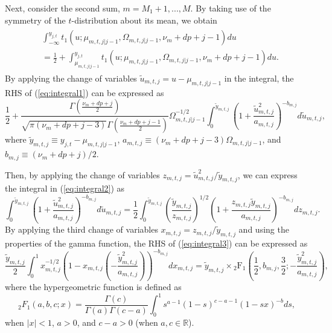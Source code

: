\documentclass[nojss]{jss}
\begin{document}
\begin{appendix}
Next, consider the second sum,  $m=M_1+1,...,M$. By taking use of the symmetry of the $t$-distribution about its mean, we obtain
\begin{align}\label{eq:integral1}
\begin{aligned}
&\int_{-\infty}^{y_{j,t}}t_1(u;\mu_{m,t,j|j-1},\Omega_{m,t,j|j-1},\nu_m + dp + j - 1)du \\
&= \frac{1}{2} + \int_{\mu_{m,t,j|j-1}}^{y_{j,t}}t_1(u;\mu_{m,t,j|j-1},\Omega_{m,t,j|j-1},\nu_m + dp + j - 1)du.
\end{aligned}
\end{align}
By applying the change of variables $\tilde{u}_{m,t,j} = u - \mu_{m,t,j|j-1}$ in the integral, the RHS of (\ref{eq:integral1}) can be expressed as
\begin{equation}\label{eq:integral2}
\frac{1}{2} + \frac{\Gamma\left(\frac{\nu_m + dp + j}{2}\right)}{\sqrt{\pi (\nu_m + dp + j - 3)}\Gamma\left(\frac{\nu_m + dp + j - 1}{2} \right)}\Omega_{m,t,j|j-1}^{-1/2}\int_{0}^{\tilde{y}_{m,t,j}}\left(1 + \frac{\tilde{u}_{m,t,j}^2}{a_{m,t,j}} \right)^{-b_{m,j}}d\tilde{u}_{m,t,j},
\end{equation}
where $\tilde{y}_{m,t,j} \equiv y_{j,t} - \mu_{m,t,j|j-1}$,  $a_{m,t,j} \equiv (\nu_m + dp + j - 3)\Omega_{m,t,j|j-1}$, and $b_{m,j}\equiv (\nu_m + dp + j)/2$.

Then, by applying the change of variables $z_{m,t,j} =  \tilde{u}_{m,t,j}^2/\tilde{y}_{m,t,j}$,  we can express the integral in (\ref{eq:integral2}) as
\begin{equation}\label{eq:integral3}
\int_{0}^{\tilde{y}_{m,t,j}}\left(1 + \frac{\tilde{u}_{m,t,j}^2}{a_{m,t,j}} \right)^{-b_{m,j}}d\tilde{u}_{m,t,j} = \frac{1}{2}\int_{0}^{\tilde{y}_{m,t,j}}\left(\frac{\tilde{y}_{m,t,j}}{z_{m,t,j}}  \right)^{1/2}\left(1 + \frac{z_{m,t,j}\tilde{y}_{m,t,j}}{a_{m,t,j}} \right)^{-b_{m,j}}dz_{m,t,j}.
\end{equation}
By applying the third change of variables $x_{m,t,j}=z_{m,t,j}/\tilde{y}_{m,t,j}$ and using the properties of the gamma function,  the RHS of (\ref{eq:integral3}) can be expressed as
\begin{equation}
\frac{\tilde{y}_{m,t,j}}{2}\int_0^1 x_{m,t,j}^{-1/2}\left(1 - x_{m,t,j}\left(-\frac{\tilde{y}_{m,t,j}^2}{a_{m,t,j}}\right)  \right)^{-b_{m,j}}dx_{m,t,j} = \tilde{y}_{m,t,j} \times {}_2\text{F}_1\left(\frac{1}{2}, b_{m,j}, \frac{3}{2}; -\frac{\tilde{y}_{m,t,j}^2}{a_{m,t,j}} \right),
\end{equation}
where the hypergeometric function is defined as \citep[Section 1.3.1]{Aomoto+Kita:2011}
\begin{equation}
{}_2F_1(a,b,c;x)=\frac{\Gamma(c)}{\Gamma(a)\Gamma(c-a)}\int_0^1 s^{a-1}(1-s)^{c-a-1}(1-sx)^{-b}ds,
\end{equation}
when $|x|<1$, $a>0$, and $c-a>0$ (when $a,c\in\mathbb{R}$).


\end{appendix}
\end{document}
